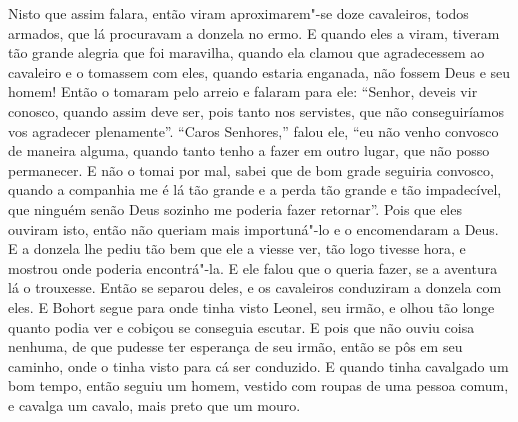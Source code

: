  Nisto que assim falara, então viram aproximarem"-se doze cavaleiros, todos
armados, que lá procuravam a donzela no ermo. E quando eles a viram, tiveram
tão grande alegria que foi maravilha, quando ela clamou que agradecessem ao
cavaleiro e o tomassem com eles, quando estaria enganada, não fossem Deus e seu
homem! Então o tomaram pelo arreio e falaram para ele: “Senhor, deveis vir
conosco, quando assim deve ser, pois tanto nos servistes, que não
conseguiríamos vos agradecer plenamente”. “Caros Senhores,” falou ele, “eu não
venho convosco de maneira alguma, quando tanto tenho a fazer em outro lugar,
que não posso permanecer. E não o tomai por mal, sabei que de bom grade
seguiria convosco, quando a companhia me é lá tão grande e a perda tão grande e
tão impadecível, que ninguém senão Deus sozinho me poderia fazer retornar”.
Pois que eles ouviram isto, então não queriam mais importuná"-lo e o
encomendaram a Deus. E a donzela lhe pediu tão bem que ele a
viesse ver, tão logo tivesse hora, e mostrou onde poderia encontrá"-la. E ele
falou que o queria fazer, se a aventura lá o trouxesse. Então se separou deles,
e os cavaleiros conduziram  a donzela com eles. E Bohort segue para onde tinha
visto Leonel, seu irmão, e olhou tão longe quanto podia ver e cobiçou se
conseguia escutar. E pois que não ouviu coisa nenhuma, de que pudesse ter
esperança de seu irmão, então se pôs em seu caminho, onde o tinha visto para cá
ser conduzido. E quando tinha cavalgado um bom tempo, então seguiu um homem,
vestido com roupas de uma pessoa comum, e cavalga um cavalo, mais preto que um
mouro. 

